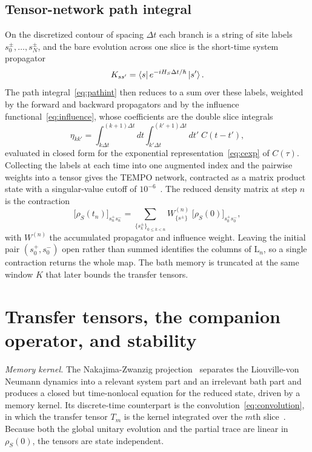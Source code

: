 \documentclass[aps,pra,twocolumn,superscriptaddress,nofootinbib,longbibliography]{revtex4-2}
\newcommand{\rhoS}{\rho_{S}}
\newcommand{\Lmap}{\mathrm{L}}
\newcommand{\dt}{\Delta t}
\begin{document}
\subsection{Tensor-network path integral}
On the discretized contour of spacing $\dt$ each branch is a string of site
labels $s_0^\pm,\dots,s_N^\pm$, and the bare evolution across one slice is the
short-time system propagator
\begin{equation}
  \label{eq:shorttime}
  K_{s s'}=\bra{s}e^{-iH_S\dt/\hbar}\ket{s'}.
\end{equation}
The path integral~\eqref{eq:pathint} then reduces to a sum over these labels,
weighted by the forward and backward propagators and by the influence
functional~\eqref{eq:influence}, whose coefficients are the double slice integrals
\begin{equation}
  \label{eq:eta}
  \eta_{kk'}=\int_{k\dt}^{(k+1)\dt}\!\!dt\int_{k'\dt}^{(k'+1)\dt}\!\!dt'\;C(t-t'),
\end{equation}
evaluated in closed form for the exponential representation~\eqref{eq:cexp} of
$C(\tau)$. Collecting the labels at each time into one augmented index and the
pairwise weights into a tensor gives the TEMPO network, contracted as a matrix
product state with a singular-value cutoff of $10^{-6}$~\cite{strathearn2018,bose2022}.
The reduced density matrix at step $n$ is the contraction
\begin{equation}
  \label{eq:pinet}
  \big[\rhoS(t_n)\big]_{s_n^+ s_n^-}=\!\!\sum_{\{s_k^\pm\}_{0\le k<n}}\!\!
  W^{(n)}_{\{s^\pm\}}\;\big[\rhoS(0)\big]_{s_0^+ s_0^-},
\end{equation}
with $W^{(n)}$ the accumulated propagator and influence weight. Leaving the
initial pair $(s_0^+,s_0^-)$ open rather than summed identifies the columns of
$\Lmap_n$, so a single contraction returns the whole map. The bath memory is
truncated at the same window $K$ that later bounds the transfer tensors.

\section{Transfer tensors, the companion operator, and stability}
\label{app:ttm}
\emph{Memory kernel.} The Nakajima-Zwanzig projection~\cite{nakajima1958,zwanzig1960}
separates the Liouville-von Neumann dynamics into a relevant system part and an
irrelevant bath part and produces a closed but time-nonlocal equation for the
reduced state, driven by a memory kernel. Its discrete-time counterpart is the
convolution~\eqref{eq:convolution}, in which the transfer tensor $T_m$ is the
kernel integrated over the $m$th slice~\cite{cerrillo2014}. Because both the
global unitary evolution and the partial trace are linear in $\rhoS(0)$, the
tensors are state independent.
\end{document}
